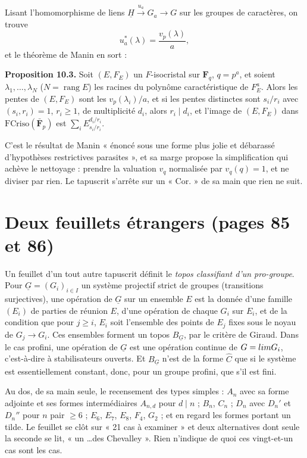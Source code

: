 \documentclass[11pt,a4paper]{article}
\begin{document}
Lisant l'homomorphisme de liens $\underline{H} \xrightarrow{u_{a}} G_{a} \to G$
sur les groupes de caractères, on trouve
\[
u_{a}^{*}(\lambda) = \frac{v_{p}(\lambda)}{a} ,
\]
et le théorème de Manin en sort :

\textbf{Proposition 10.3.} Soit $(E, F_{E})$ un $F$-isocristal sur
$\mathbf{F}_{q}$, $q = p^{a}$, et soient $\lambda_{1}, \ldots, \lambda_{N}$
($N = \operatorname{rang} E$) les racines du polynôme caractéristique de
$F_{E}^{a}$. Alors les pentes de $(E, F_{E})$ sont les $v_{p}(\lambda_{i})/a$,
et si les pentes distinctes sont $s_{i}/r_{i}$ avec $(s_{i}, r_{i}) = 1$,
$r_{i} \geqslant 1$, de multiplicité $d_{i}$, alors $r_{i} \mid d_{i}$, et
l'image de $(E, F_{E})$ dans $\mathrm{FCriso}(\bar{\mathbf{F}}_{p})$ est
$\sum_{i} E_{s_{i}/r_{i}}^{d_{i}/r_{i}}$.

C'est le résultat de Manin « énoncé sous une forme plus jolie et débarassé
d'hypothèses restrictives parasites », et sa marge propose la simplification
qui achève le nettoyage : prendre la valuation $v_{q}$ normalisée par
$v_{q}(q) = 1$, et ne diviser par rien. Le tapuscrit s'arrête sur un
« Cor. » de sa main que rien ne suit.

\section*{Deux feuillets étrangers (pages 85 et 86)}

Un feuillet d'un tout autre tapuscrit définit le \emph{topos classifiant d'un
pro-groupe}. Pour $\underline{G} = (G_{i})_{i \in I}$ un système projectif
strict de groupes (transitions surjectives), une opération de
$\underline{G}$ sur un ensemble $E$ est la donnée d'une famille $(E_{i})$ de
parties de réunion $E$, d'une opération de chaque $G_{i}$ sur $E_{i}$, et de la
condition que pour $j \geqslant i$, $E_{i}$ soit l'ensemble des points de
$E_{j}$ fixes sous le noyau de $G_{j} \to G_{i}$. Ces ensembles forment un
topos $B_{\underline{G}}$, par le critère de Giraud. Dans le cas profini, une
opération de $\underline{G}$ est une opération continue de $G = \varprojlim
G_{i}$, c'est-à-dire à stabilisateurs ouverts. Et $B_{\underline{G}}$ n'est de
la forme $\hat{C}$ que si le système est essentiellement constant, donc,
pour un groupe profini, que s'il est fini.

Au dos, de sa main seule, le recensement des types simples : $A_{n}$ avec sa
forme adjointe et ses formes intermédiaires $A_{n,d}$ pour $d \mid n$ ;
$B_{n}$, $C_{n}$ ; $D_{n}$ avec $D_{n}'$ et $D_{n}''$ pour $n$ pair
$\geqslant 6$ ; $E_{6}$, $E_{7}$, $E_{8}$, $F_{4}$, $G_{2}$ ; et en regard les
formes portant un tilde. Le feuillet se clôt sur « 21 cas à examiner » et deux
alternatives dont seule la seconde se lit, « un \ldots des Chevalley ». Rien
n'indique de quoi ces vingt-et-un cas sont les cas.
\end{document}
